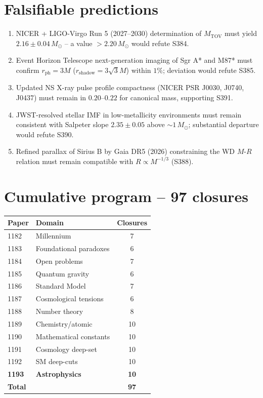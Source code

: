 \documentclass[11pt]{article}
\begin{document}
\section{Falsifiable predictions}
\begin{enumerate}[label=(F\arabic*)]
\item NICER + LIGO-Virgo Run 5 (2027--2030) determination of $M_{\text{TOV}}$ must yield $2.16\pm 0.04\,M_\odot$ -- a value $>2.20\,M_\odot$ would refute S384.
\item Event Horizon Telescope next-generation imaging of Sgr A* and M87* must confirm $r_{\text{ph}}=3M$ ($r_{\text{shadow}}=3\sqrt{3}M$) within $1\%$; deviation would refute S385.
\item Updated NS X-ray pulse profile compactness (NICER PSR J0030, J0740, J0437) must remain in $0.20$--$0.22$ for canonical mass, supporting S391.
\item JWST-resolved stellar IMF in low-metallicity environments must remain consistent with Salpeter slope $2.35\pm 0.05$ above $\sim 1\,M_\odot$; substantial departure would refute S390.
\item Refined parallax of Sirius B by Gaia DR5 (2026) constraining the WD $M$-$R$ relation must remain compatible with $R\propto M^{-1/3}$ (S388).
\end{enumerate}

\section{Cumulative program -- 97 closures}
\begin{table}[h!]
\centering
\begin{tabular}{llc}
\toprule
Paper & Domain & Closures \\
\midrule
1182 & Millennium                  & 7 \\
1183 & Foundational paradoxes      & 6 \\
1184 & Open problems               & 7 \\
1185 & Quantum gravity             & 6 \\
1186 & Standard Model              & 7 \\
1187 & Cosmological tensions       & 6 \\
1188 & Number theory               & 8 \\
1189 & Chemistry/atomic            & 10 \\
1190 & Mathematical constants      & 10 \\
1191 & Cosmology deep-set          & 10 \\
1192 & SM deep-cuts                & 10 \\
\textbf{1193} & \textbf{Astrophysics}       & \textbf{10} \\
\midrule
\textbf{Total} & & \textbf{97} \\
\bottomrule
\end{tabular}
\end{table}
\end{document}
